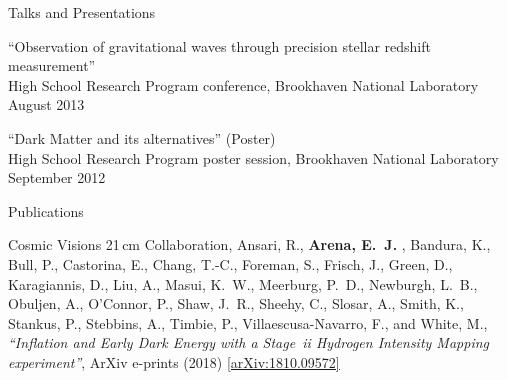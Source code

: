 \documentclass{resume} %
\newcommand{\forceindent}{\leavevmode{\parindent=1em\indent}}
\begin{document}
\begin{rSection}{Talks and Presentations}

``Observation of gravitational waves through precision stellar redshift measurement''\\
\forceindent High School Research Program conference, Brookhaven National Laboratory \hfill August 2013
 
``Dark Matter and its alternatives'' (Poster)\\
\forceindent High School Research Program poster session, Brookhaven National Laboratory \hfill September 2012

\end{rSection}


\begin{rSection}{Publications}

{Cosmic Visions 21$\,$cm Collaboration}, {Ansari}, R., \textbf{{Arena}, E.~J.} , 
	{Bandura}, K., {Bull}, P., {Castorina}, E., {Chang}, T.-C., 
	{Foreman}, S., {Frisch}, J., {Green}, D., {Karagiannis}, D., 
	{Liu}, A., {Masui}, K.~W., {Meerburg}, P.~D., {Newburgh}, L.~B., 
	{Obuljen}, A., {O'Connor}, P., {Shaw}, J.~R., {Sheehy}, C., 
	{Slosar}, A., {Smith}, K., {Stankus}, P., {Stebbins}, A., 
	{Timbie}, P., {Villaescusa-Navarro}, F., and {White}, M., 
\textit{``Inflation and Early Dark Energy with a {Stage~{\sc ii}} Hydrogen Intensity Mapping experiment''}, ArXiv e-prints (2018) \href{https://arxiv.org/abs/1810.09572}{[arXiv:1810.09572]}

\end{rSection}







\end{document}
